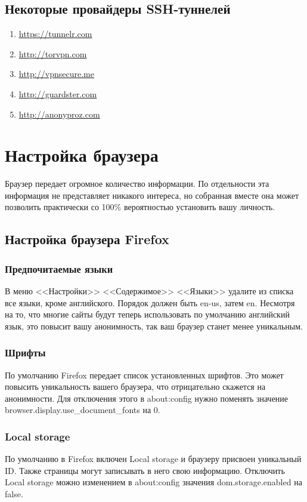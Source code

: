 \subsection{Некоторые провайдеры SSH-туннелей}
\begin{enumerate}
\item \url{https://tunnelr.com}
\item \url{http://torvpn.com}
\item \url{http://vpnsecure.me}
\item \url{http://guardster.com}
\item \url{http://anonyproz.com}
\end{enumerate}

\section{Настройка браузера}
\begin{important}
Браузер передает огромное количество информации. По отдельности эта информация не представляет никакого интереса, но собранная вместе она может позволить практически со 100\% вероятностью установить вашу личность.
\end{important}
\subsection{Настройка браузера Firefox}
\subsubsection{Предпочитаемые языки}
В меню <<Настройки>> \textrightarrow <<Содержимое>> \textrightarrow <<Языки>> удалите из списка все языки, кроме английского. Порядок должен быть en-us, затем en. Несмотря на то, что многие сайты будут теперь использовать по умолчанию английский язык, это повысит вашу анонимность, так ваш браузер станет менее уникальным.
\subsubsection{Шрифты}
По умолчанию Firefox передает список установленных шрифтов. Это может повысить уникальность вашего браузера, что отрицательно скажется на анонимности. Для отключения этого в about:config нужно поменять значение browser.display.use\_document\_fonts на 0.
\subsubsection{Local storage}
По умолчанию в Firefox включен Local storage и браузеру присвоен уникальный ID. Также страницы могут записывать в него свою информацию. Отключить Local storage можно изменением в about:config значения dom.storage.enabled на false.
